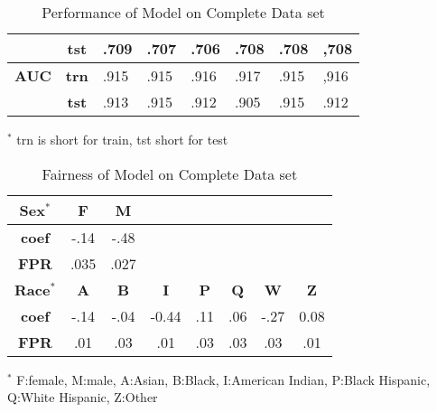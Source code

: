 \begin{table}[htb]
\begin{tabular}{@{}ccllllll@{}}
                                    & \textbf{tst}                  & .709                            & .707                            & .706                            & .708                            & .708                            & ,708                              \\ \hline
\multirow{}{}{\textbf{AUC}}       & \textbf{trn}                 & .915                            & .915                            & .916                            & .917                            & .915                            & ,916                              \\ \cmidrule(lr){2-2}
                                    & \textbf{tst}                  & .913                            & .915                            & .912                            & .905                            & .915                            & .912                              \\ \hline
\end{tabular}

    \caption{Performance of Model on Complete Data set}
    \footnotesize{$^*$ trn is short for train, tst short for test}\\
    \label{Table:metric-raw}
\end{table}

\begin{table}[htb]
\centering
\begin{tabular}{cccccccc}
\hline
\textbf{Sex$^*$} & \textbf{F} & \textbf{M} &            &            &            &            &            \\ \hline
\textbf{coef}   & -.14        & -.48        &            &            &            &            &            \\
\textbf{FPR}    & .035        & .027        &            &            &            &            &            \\ \hline
\textbf{Race$^*$}       & \textbf{A} & \textbf{B} & \textbf{I} & \textbf{P} & \textbf{Q} & \textbf{W} & \textbf{Z} \\ \hline
\textbf{coef}   & -.14         & -.04        & -0.44       & .11        & .06         & -.27         & 0.08       \\
\textbf{FPR}    & .01        & .03        & .01        & .03        & .03        & .03        & .01   \\  \hline  
\end{tabular}
\caption{Fairness of Model on Complete Data set}
    \footnotesize{$^*$ F:female, M:male, A:Asian, B:Black, I:American Indian, P:Black Hispanic, Q:White Hispanic, Z:Other}
    \label{Table:Fairness metric-raw}
\end{table}


